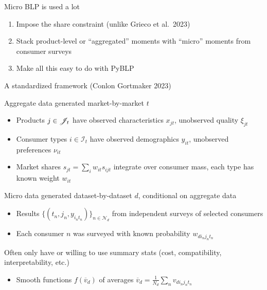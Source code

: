 \documentclass[aspectratio=169,10pt]{beamer}
\begin{document}
\begin{frame}{Micro BLP is used a lot}
\begin{wideitemize}
        \begin{enumerate}
            \item Impose the \cite{berry1995automobile} share constraint (unlike {\color{light gray}Grieco et al.\ 2023}) \nocite{grieco2023conformant}
            \item Stack product-level or ``\alert{aggregated}'' moments with ``\alert{micro}'' moments from consumer surveys
            \item Make all this easy to do with \alert{PyBLP}
        \end{enumerate}
    \end{wideitemize}
\end{frame}

\begin{frame}[label=framework]{A standardized framework (Conlon Gortmaker 2023)}
    \begin{wideitemize}
        
        \item Aggregate data generated market-by-market $t$
        \begin{itemize}
            \item \alert{Products} $j \in \mathscr{J}_t$ have observed characteristics $x_{jt}$, unobserved quality $\xi_{jt}$
            \item \alert{Consumer types} $i \in \mathcal{I}_t$ have observed demographics $y_{it}$, unobserved preferences $\nu_{it}$
            \item \alert{Market shares} $s_{jt} = \sum_i w_{it} s_{ijt}$ integrate over consumer mass, each type has known weight $w_{it}$
        \end{itemize}
        
        \item Micro data generated dataset-by-dataset $d$, conditional on aggregate data
        \begin{itemize}
            \item Results $\{(t_n, j_n, y_{i_nt_n})\}_{n \in \mathcal{N}_d}$ from \alert{independent surveys} of \alert{selected consumers}
            \item Each consumer $n$ was surveyed with known probability $w_{di_nj_nt_n}$
        \end{itemize}
        
        \item Often only have or willing to use \alert{summary stats} (cost, compatibility, interpretability, etc.)
        \begin{itemize}
            \item Smooth functions $f(\overline{v}_d)$ of averages $\overline{v}_d = \frac{1}{N_d} \sum_n v_{di_nj_nt_n}$
        \end{itemize}
        

\end{wideitemize}
\end{frame}
\end{document}
